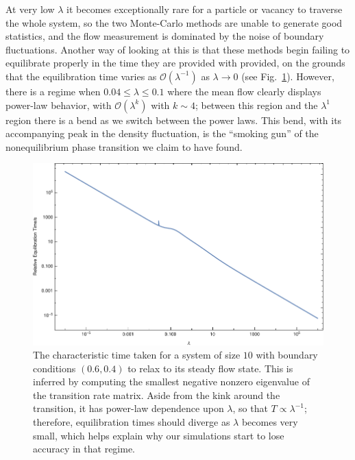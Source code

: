 \documentclass[
reprint, amsmath,amssymb,
]{revtex4-1}
\begin{document}
At very low
$\lambda$ it becomes exceptionally rare for a particle or vacancy to
traverse the whole system, so the two Monte-Carlo methods are unable to generate good statistics, 
and the flow measurement is dominated by
the noise of boundary fluctuations. Another way of looking at this is that these methods begin failing
to equilibrate properly in the time they are provided with provided, on the grounds that the equilibration time varies as $\mathcal{O}(\lambda^{-1})$ as $\lambda \rightarrow 0$ (see Fig.~\ref{fig:relaxTime}).
However, there is a regime when $0.04 \le \lambda \le 0.1$
where the mean flow clearly displays power-law behavior,
with $\mathcal{O}(\lambda^{k})$ with $k \sim 4$; between this region and the
$\lambda^1$ region there is a bend as we switch between the power laws. This bend,
with its accompanying peak in the density fluctuation, is the ``smoking gun'' of the
nonequilibrium phase transition we claim to have found.


\begin{figure}[h!]
\vspace{0em}
\begin{center}
    \includegraphics[width=1\linewidth]{relaxTime}
\end{center}
    \vspace{-0em}
\caption{\label{fig:relaxTime} The characteristic time taken for a system of size $10$ with boundary conditions $(0.6, 0.4)$ to relax to its steady flow state. This is inferred by computing the smallest negative nonzero eigenvalue
of the transition rate matrix. Aside from the kink around the transition, it has power-law dependence upon $\lambda$, so that $T \propto \lambda^{-1}$; therefore, equilibration times should diverge as $\lambda$ becomes very small,
which helps explain why our simulations start to lose accuracy in that regime.}
\end{figure}
\end{document}
